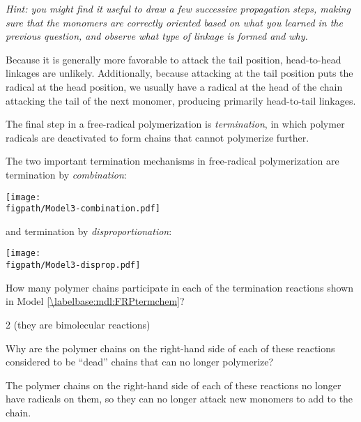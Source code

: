 \begin{activity}
\begin{ctqs}
				\emph{Hint: you might find it useful to draw a few successive propagation steps, making sure that the monomers are correctly oriented based on what you learned in the previous question, and observe what type of linkage is formed and why.}
				
				\begin{solution}[2.75in]
					Because it is generally more favorable to attack the tail position, head-to-head linkages are unlikely.  Additionally, because attacking at the tail position puts the radical at the head position, we usually have a radical at the head of the chain attacking the tail of the next monomer, producing primarily head-to-tail linkages.
								
				\end{solution}
		
\end{ctqs}	

\begin{model}[Termination]
\label{\labelbase:mdl:FRPtermchem}

	The final step in a free-radical polymerization is \emph{termination}, in which polymer radicals are deactivated to form chains that cannot polymerize further.
	
	The two important termination mechanisms in free-radical polymerization are termination by \emph{combination}:
	
			\centerline{\texttt{[image: \\figpath/Model3-combination.pdf]}}
	
	and termination by \emph{disproportionation}:
	
			\centerline{\texttt{[image: \\figpath/Model3-disprop.pdf]}}

\end{model}

\begin{ctqs}

	\question How many polymer chains participate in each of the termination reactions shown in Model \ref{\labelbase:mdl:FRPtermchem}?
	
		\begin{solution}[0.5in]
			2 (they are bimolecular reactions)
		\end{solution}

	\question Why are the polymer chains on the right-hand side of each of these reactions considered to be ``dead'' chains that can no longer polymerize?
	
		\begin{solution}[1.25in]
			The polymer chains on the right-hand side of each of these reactions no longer have radicals on them, so they can no longer attack new monomers to add to the chain.
		\end{solution}
	

\end{ctqs}
\end{activity}
